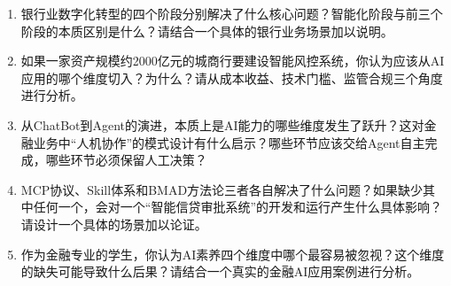 
\begin{exercisebox}[思考题]
\begin{enumerate}[leftmargin=1.5em]
  \item 银行业数字化转型的四个阶段分别解决了什么核心问题？智能化阶段与前三个阶段的本质区别是什么？请结合一个具体的银行业务场景加以说明。

  \item 如果一家资产规模约2000亿元的城商行要建设智能风控系统，你认为应该从AI应用的哪个维度切入？为什么？请从成本收益、技术门槛、监管合规三个角度进行分析。

  \item 从ChatBot到Agent的演进，本质上是AI能力的哪些维度发生了跃升？这对金融业务中``人机协作''的模式设计有什么启示？哪些环节应该交给Agent自主完成，哪些环节必须保留人工决策？

  \item MCP协议、Skill体系和BMAD方法论三者各自解决了什么问题？如果缺少其中任何一个，会对一个``智能信贷审批系统''的开发和运行产生什么具体影响？请设计一个具体的场景加以论证。

  \item 作为金融专业的学生，你认为AI素养四个维度中哪个最容易被忽视？这个维度的缺失可能导致什么后果？请结合一个真实的金融AI应用案例进行分析。
\end{enumerate}
\end{exercisebox}


